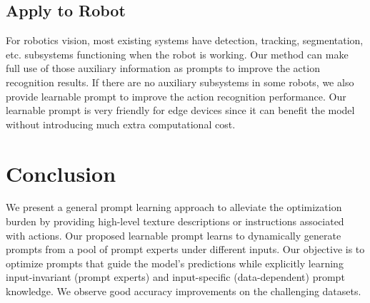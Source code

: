 \documentclass[letterpaper, 10 pt, conference]{ieeeconf}
\begin{document}
\subsection{Apply to Robot}
For robotics vision, most existing systems have detection, tracking, segmentation, etc. subsystems functioning when the robot is working. Our method can make full use of those auxiliary information as prompts to improve the action recognition results. If there are no auxiliary subsystems in some robots, we also provide learnable prompt to improve the action recognition performance. Our learnable prompt is very friendly for edge devices since it can benefit the model without introducing much extra computational cost.

 

\section{Conclusion}

We present a general prompt learning approach to alleviate the optimization burden by providing high-level texture descriptions or instructions associated with actions. Our proposed learnable prompt learns to dynamically generate prompts from a pool of prompt experts under different inputs. Our objective is to optimize prompts that guide the model's predictions while explicitly learning input-invariant (prompt experts) and input-specific (data-dependent) prompt knowledge. We observe good accuracy improvements on the challenging datasets. 


 


\end{document}
